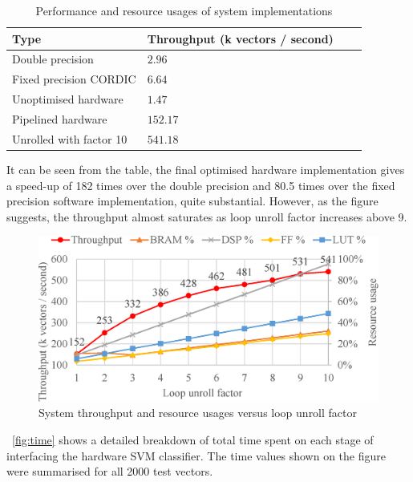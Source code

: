 \documentclass[journal]{IEEEtran}
\newcommand{\fref}[1]{\figurename~\ref{#1}}
\begin{document}
\begin{table}[ht]
	\renewcommand{\arraystretch}{1.3}
	\caption{Performance and resource usages of system implementations}
	\label{tbl:throughput}
	\centering
	\begin{tabular}{llll}
		\hline
		Type			& Throughput (k vectors / second)	\\
		\hline
		Double precision	& $2.96$	\\
		Fixed precision CORDIC	& $6.64$	\\
		\hline
		Unoptimised hardware	& $1.47$	\\
		Pipelined hardware	& $152.17$	\\
		Unrolled with factor 10	& $541.18$	\\
		\hline
	\end{tabular}
\end{table}

It can be seen from the table, the final optimised hardware implementation gives a speed-up of 182 times over the double precision and 80.5 times over the fixed precision software implementation, quite substantial. However, as the figure suggests, the throughput almost saturates as loop unroll factor increases above 9.

\begin{figure}[ht]
	\centering
	\includegraphics[width=0.9\columnwidth]{throughput}
	\caption{System throughput and resource usages versus loop unroll factor}
	\label{fig:throughput}
\end{figure}

\fref{fig:time} shows a detailed breakdown of total time spent on each stage of interfacing the hardware SVM classifier. The time values shown on the figure were summarised for all 2000 test vectors.
\end{document}
